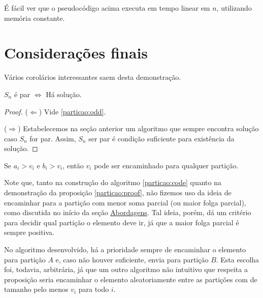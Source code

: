 É fácil ver que o pseudocódigo acima executa em tempo linear em $n$, utilizando memória constante.

\section{Considerações finais}

Vários corolários interessantes saem desta demonstração.

\begin{cor}
$S_n$ é par $\Leftrightarrow$ Há solução.
\end{cor}
\begin{proof}

($\Leftarrow$) Vide \ref{particao:odd}.

($\Rightarrow$) Estabelecemos na seção anterior um algoritmo que sempre encontra solução caso $S_n$ for par. Assim, $S_n$ ser par é condição suficiente para existência da solução.

\end{proof}

\begin{cor}
Se $a_i > v_i$ e $b_i > v_i$, então $v_i$ pode ser encaminhado para qualquer partição.
\end{cor}

Note que, tanto na construção do algoritmo \ref{particao:code} quanto na demonstração da proposição \ref{particao:proof}, não fizemos uso da ideia de encaminhar para a partição com menor soma parcial (ou maior folga parcial), como discutida no início da seção \hyperref[particao:abordagem]{Abordagens}. Tal ideia, porém, dá um critério para decidir qual partição o elemento deve ir, já que a maior folga parcial é sempre positiva.

No algoritmo desenvolvido, há a prioridade sempre de encaminhar o elemento para partição $A$ e, caso não houver  suficiente, envia para partição $B$. Esta escolha foi, todavia, arbitrária, já que um outro algoritmo não intuitivo que respeita a proposição seria encaminhar o elemento aleatoriamente entre as partições com  de tamanho pelo menos $v_i$ para todo $i$.

